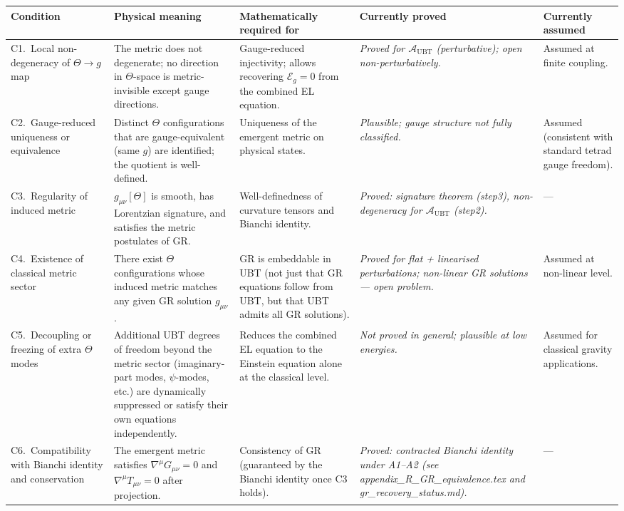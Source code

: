 \documentclass[12pt]{article}
\theoremstyle{definition}
\theoremstyle{remark}
\begin{document}
\begin{longtable}{@{}p{3.5cm}p{3.5cm}p{3.5cm}p{1.8cm}p{1.8cm}@{}}
\toprule
\textbf{Condition} &
\textbf{Physical meaning} &
\textbf{Mathematically required for} &
\textbf{Currently proved} &
\textbf{Currently assumed}
\\
\midrule
\endhead
%
C1.\ Local non-degeneracy of $\Theta \to g$ map
& The metric does not degenerate; no direction in $\Theta$-space
  is metric-invisible except gauge directions.
& Gauge-reduced injectivity; allows recovering
  $\mathcal{E}_g = 0$ from the combined EL equation.
& \emph{Proved for $\mathcal{A}_{\mathrm{UBT}}$ (perturbative);
  open non-perturbatively.}
& Assumed at finite coupling.
\\[4pt]
%
C2.\ Gauge-reduced uniqueness or equivalence
& Distinct $\Theta$ configurations that are gauge-equivalent
  (same $g$) are identified; the quotient is well-defined.
& Uniqueness of the emergent metric on physical states.
& \emph{Plausible; gauge structure not fully classified.}
& Assumed (consistent with standard tetrad gauge freedom).
\\[4pt]
%
C3.\ Regularity of induced metric
& $g_{\mu\nu}[\Theta]$ is smooth, has Lorentzian signature,
  and satisfies the metric postulates of GR.
& Well-definedness of curvature tensors and Bianchi identity.
& \emph{Proved: signature theorem (step3), non-degeneracy for
  $\mathcal{A}_{\mathrm{UBT}}$ (step2).}
& —
\\[4pt]
%
C4.\ Existence of classical metric sector
& There exist $\Theta$ configurations whose induced metric
  matches any given GR solution $g_{\mu\nu}$.
& GR is embeddable in UBT (not just that GR equations follow
  from UBT, but that UBT admits all GR solutions).
& \emph{Proved for flat + linearised perturbations; non-linear
  GR solutions — open problem.}
& Assumed at non-linear level.
\\[4pt]
%
C5.\ Decoupling or freezing of extra $\Theta$ modes
& Additional UBT degrees of freedom beyond the metric sector
  (imaginary-part modes, $\psi$-modes, etc.) are dynamically
  suppressed or satisfy their own equations independently.
& Reduces the combined EL equation to the Einstein equation
  alone at the classical level.
& \emph{Not proved in general; plausible at low energies.}
& Assumed for classical gravity applications.
\\[4pt]
%
C6.\ Compatibility with Bianchi identity and conservation
& The emergent metric satisfies $\nabla^\mu G_{\mu\nu} = 0$
  and $\nabla^\mu T_{\mu\nu} = 0$ after projection.
& Consistency of GR (guaranteed by the Bianchi identity once
  C3 holds).
& \emph{Proved: contracted Bianchi identity under A1--A2 (see
  appendix\_R\_GR\_equivalence.tex and gr\_recovery\_status.md).}
& —
\\
\bottomrule
\end{longtable}
\end{document}

